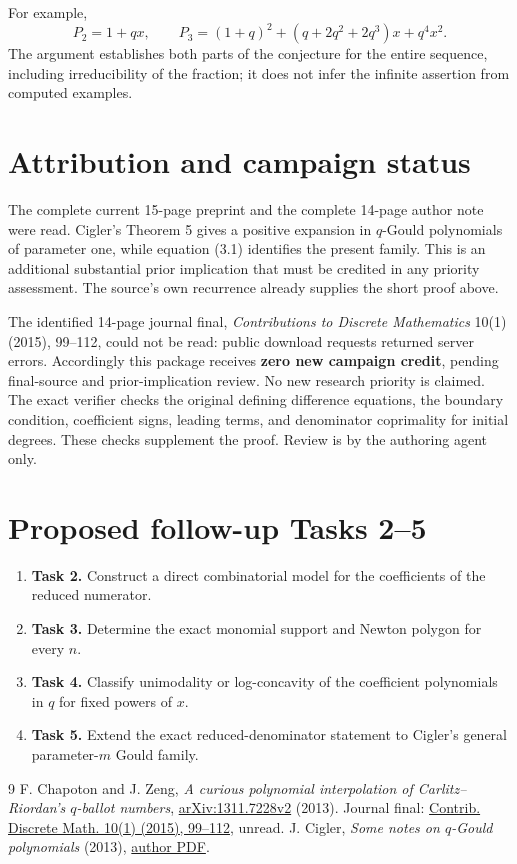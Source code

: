 \documentclass[11pt]{article}
\begin{document}
For example,
\[
 P_2=1+qx,\qquad
 P_3=(1+q)^2+(q+2q^2+2q^3)x+q^4x^2 .
\]
The argument establishes both parts of the conjecture for the entire
sequence, including irreducibility of the fraction; it does not infer
the infinite assertion from computed examples.

\section*{Attribution and campaign status}
The complete current 15-page preprint \cite{CZ} and the complete
14-page author note \cite{C} were read. Cigler's Theorem 5 gives a
positive expansion in $q$-Gould polynomials of parameter one, while
equation (3.1) identifies the present family. This is an additional
substantial prior implication that must be credited in any priority
assessment. The source's own recurrence already supplies the short
proof above.

The identified 14-page journal final, \emph{Contributions to Discrete
Mathematics} 10(1) (2015), 99--112, could not be read: public download
requests returned server errors. Accordingly this package receives
\textbf{zero new campaign credit}, pending final-source and
prior-implication review. No new research priority is claimed.
The exact verifier checks the original defining difference equations,
the boundary condition, coefficient signs, leading terms, and denominator
coprimality for initial degrees. These checks supplement the proof.
Review is by the authoring agent only.

\section*{Proposed follow-up Tasks 2--5}
\begin{enumerate}
\item \textbf{Task 2.} Construct a direct combinatorial model for the
coefficients of the reduced numerator.
\item \textbf{Task 3.} Determine the exact monomial support and Newton
polygon for every $n$.
\item \textbf{Task 4.} Classify unimodality or log-concavity of the
coefficient polynomials in $q$ for fixed powers of $x$.
\item \textbf{Task 5.} Extend the exact reduced-denominator statement to
Cigler's general parameter-$m$ Gould family.
\end{enumerate}

\begin{thebibliography}{9}
 F. Chapoton and J. Zeng,
\emph{A curious polynomial interpolation of Carlitz--Riordan's
$q$-ballot numbers}, \href{https://arxiv.org/abs/1311.7228}{arXiv:1311.7228v2}
(2013). Journal final:
\href{https://doi.org/10.55016/ojs/cdm.v10i1.62222}{Contrib. Discrete Math.
10(1) (2015), 99--112}, unread.
 J. Cigler, \emph{Some notes on $q$-Gould polynomials} (2013),
\href{https://homepage.univie.ac.at/johann.cigler/preprints/gould.pdf}{author PDF}.
\end{thebibliography}
\end{document}
